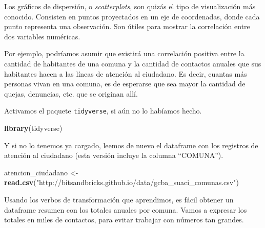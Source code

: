 \documentclass[]{book}
\newenvironment{Shaded}{\begin{snugshade}}{\end{snugshade}}
\newcommand{\KeywordTok}[1]{\textcolor[rgb]{0.13,0.29,0.53}{\textbf{#1}}}
\newcommand{\DataTypeTok}[1]{\textcolor[rgb]{0.13,0.29,0.53}{#1}}
\newcommand{\DecValTok}[1]{\textcolor[rgb]{0.00,0.00,0.81}{#1}}
\newcommand{\StringTok}[1]{\textcolor[rgb]{0.31,0.60,0.02}{#1}}
\newcommand{\OperatorTok}[1]{\textcolor[rgb]{0.81,0.36,0.00}{\textbf{#1}}}
\newcommand{\NormalTok}[1]{#1}
\begin{document}
Los gráficos de dispersión, o \emph{scatterplots}, son quizás el tipo de
visualización más conocido. Consisten en puntos proyectados en un eje de
coordenadas, donde cada punto representa una observación. Son útiles
para mostrar la correlación entre dos variables numéricas.

Por ejemplo, podríamos asumir que existirá una correlación positiva
entre la cantidad de habitantes de una comuna y la cantidad de contactos
anuales que sus habitantes hacen a las líneas de atención al ciudadano.
Es decir, cuantas más personas vivan en una comuna, es de esperarse que
sea mayor la cantidad de quejas, denuncias, etc. que se originan allí.

Activamos el paquete \texttt{tidyverse}, si aún no lo habíamos hecho.

\begin{Shaded}
\begin{Highlighting}[]
\KeywordTok{library}\NormalTok{(tidyverse)}
\end{Highlighting}
\end{Shaded}

Y si no lo tenemos ya cargado, leemos de nuevo el dataframe con los
registros de atención al ciudadano (esta versión incluye la columna
``COMUNA'').

\begin{Shaded}
\begin{Highlighting}[]
\NormalTok{atencion_ciudadano <-}\StringTok{ }\KeywordTok{read.csv}\NormalTok{(}\StringTok{"http://bitsandbricks.github.io/data/gcba_suaci_comunas.csv"}\NormalTok{)}
\end{Highlighting}
\end{Shaded}

Usando los verbos de transformación que aprendimos, es fácil obtener un
dataframe resumen con los totales anuales por comuna. Vamos a expresar
los totales en miles de contactos, para evitar trabajar con números tan
grandes.

\begin{Shaded}
\end{Shaded}
\end{document}
